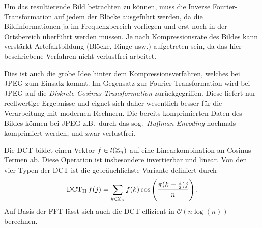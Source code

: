 Um das resultierende Bild betrachten zu können, muss die Inverse Fourier-Transformation auf jedem 
der Blöcke ausgeführt werden, da die Bildinformationen ja im Frequenzbereich vorliegen und erst 
noch in der Ortsbereich überführt werden müssen. Je nach Kompressionsrate des Bildes kann verstärkt 
Artefaktbildung (Blöcke, Ringe usw.) aufgetreten sein, da das hier beschriebene Verfahren nicht 
verlustfrei arbeitet.

Dies ist auch die grobe Idee hinter dem Kompressionsverfahren, welches bei JPEG zum Einsatz kommt. 
Im Gegensatz zur Fourier-Transformation wird bei JPEG auf die \emph{Diskrete Cosinus-Transformation}
zurückgegriffen. Diese liefert nur reellwertige Ergebnisse und eignet sich daher wesentlich besser
für die Verarbeitung mit modernen Rechnern. Die bereits komprimierten Daten des Bildes können bei
JPEG z.B.\ durch das sog.\ \emph{Huffman-Encoding} nochmals komprimiert werden, und zwar 
verlustfrei.

\begin{definition}
Die DCT bildet einen Vektor $ f \in l(\mathbb{Z}_{n}) $ auf eine Linearkombination an Cosinus-Termen ab.
Diese Operation ist insbesondere invertierbar und linear. Von den vier Typen der DCT ist die 
gebräuchlichste Variante definiert durch
\[
  \DCT2 f(j) = \sum_{k \in \Z_{n}} f(k) \cos \left( \frac{\pi (k + \frac{1}{2})j}{n} \right).
\]
Auf Basis der FFT lässt sich auch die DCT effizient in $ \mathcal{O}(n \log(n)) $ berechnen.
\end{definition}